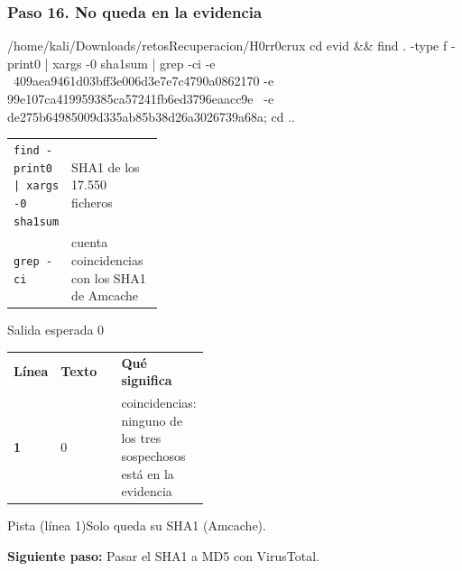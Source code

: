 \documentclass[11pt,a4paper]{article}
\begin{document}
\subsubsection*{Paso 16. No queda en la evidencia}
\begin{comando}{/home/kali/Downloads/retosRecuperacion/H0rr0crux}
cd evid && find . -type f -print0 | xargs -0 sha1sum | grep -ci -e \
  409aea9461d03bff3e006d3e7e7c4790a0862170 -e 99e107ca419959385ca57241fb6ed3796eaacc9e \
  -e de275b64985009d335ab85b38d26a3026739a68a; cd ..
\end{comando}
\begin{tcolorbox}[enhanced, breakable, colback=white, colframe=gray!40, boxrule=0.3pt, arc=1pt, left=4pt, right=4pt, top=2pt, bottom=2pt, fonttitle=\sffamily\scriptsize\bfseries, coltitle=black!75, colbacktitle=gray!8, title={Qué hace cada parte}, attach title to upper, before skip=2pt, after skip=4pt, fontupper=\small]
\par{\renewcommand{\arraystretch}{1.12}\begin{tabularx}{\linewidth}{@{}>{\raggedright\arraybackslash}p{0.33\linewidth}>{\raggedright\arraybackslash}X@{}}
\texttt{find -print0 |\allowbreak{} xargs -0 sha1sum} & SHA1 de los 17.550 ficheros \\
\texttt{grep -ci} & cuenta coincidencias con los SHA1 de Amcache \\
\end{tabularx}}
\end{tcolorbox}
\begin{salidan}{Salida esperada}
0
\end{salidan}
\begin{tcolorbox}[enhanced, breakable, colback=white, colframe=blue!40, boxrule=0.3pt, arc=1pt, left=4pt, right=4pt, top=2pt, bottom=2pt, fonttitle=\sffamily\scriptsize\bfseries, coltitle=black!75, colbacktitle=blue!8, title={Análisis de la salida}, attach title to upper, before skip=2pt, after skip=4pt, fontupper=\small]
\par{\renewcommand{\arraystretch}{1.12}\begin{tabularx}{\linewidth}{@{}>{\raggedright\arraybackslash}p{0.07\linewidth}>{\raggedright\arraybackslash}p{0.36\linewidth}>{\raggedright\arraybackslash}X@{}}
\textbf{Línea} & \textbf{Texto} & \textbf{Qué significa} \\
\textbf{1} & {\ttfamily\scriptsize 0} & 0 coincidencias: ninguno de los tres sospechosos está en la evidencia \\
\end{tabularx}}
\end{tcolorbox}
\begin{pista}{Pista (línea 1)}Solo queda su SHA1 (Amcache).\par\smallskip\textbf{Siguiente paso:} Pasar el SHA1 a MD5 con VirusTotal.\end{pista}
\end{document}
